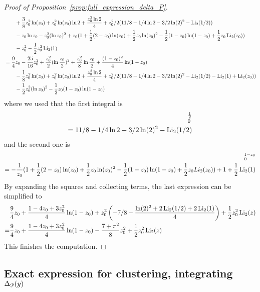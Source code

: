\begin{proof}[Proof of Proposition~\ref{prop:full_expression_delta_P}]
\begin{align*}
&\qquad+\frac{3}{8}z_0^2\ln(z_0)+z_0^2\ln(z_0)\ln 2+\frac{z_0^2 \ln2}{4}+z_0^2/2(11/8 -1/4 \ln 2 -3/2\ln(2)^2 -  \operatorname{Li}_2(1/2)) \\
&\qquad-z_0 \ln z_0-z_0^2(\ln z_0)^2+z_0(1 + \frac{1}{2}(2-z_0) \ln(z_0) + \frac{1}{2}z_0 \ln(z_0)^2 - \frac{1}{2} (1-z_0) \ln(1-z_0) +\frac{1}{2}z_0 \operatorname{Li}_2(z_0))\\
&\qquad-z_0^2   -\frac{1}{2}  z_0^2\operatorname{Li}_2(1) \\
&=\frac{9}{4}z_0-\frac{25}{16}z_0^2 +\frac{z_0^2}{2}(\ln\frac{z_0}{2})^2+\frac{z_0^2}{8}\ln\frac{z_0}{2} +\frac{(1-z_0)^2}{4}\ln(1-z_0) \\
&\qquad-\frac{1}{8}z_0^2\ln(z_0)+z_0^2\ln(z_0)\ln 2+\frac{z_0^2 \ln2}{4}+z_0^2/2(11/8 -1/4 \ln 2 -3/2\ln(2)^2 -  \operatorname{Li}_2(1/2)-\operatorname{Li}_2(1)+\operatorname{Li}_2(z_0)) \\
&\qquad-\frac{1}{2}z_0^2(\ln z_0)^2 - \frac{1}{2} z_0(1-z_0) \ln(1-z_0)
\end{align*}
where we used that the first integral is
\begin{align*}
[1/2 (-2 + 5 t + t^2 - \ln(1 - t)^2 - 2 t \ln t - t^2 \ln t - 
   \ln(1 - t) (-3 + 2 t + t^2 + 2\ln t) - 2 \Li_2(t))]_0^{\frac{1}{2}} \\
= 11/8 -1/4 \ln 2 -3/2\ln(2)^2 -  \Li_2(1/2)
\end{align*}
and the second one is
\begin{align*}
[\frac{1}{-1+ t} (1 + \frac{1}{2}(1 + t) \ln(1 - t) + \frac{1}{2}(1 - t) \ln(
1 -t)^2 - \frac{1}{2} t \ln(t) +\frac{1}{2} (1 - t) \Li_2(1 -t))]_0^{1-z_0} \\
=-\frac{1}{z_0} (1 + \frac{1}{2}(2-z_0) \ln(z_0) + \frac{1}{2}z_0 \ln(z_0)^2 - \frac{1}{2} (1-z_0) \ln(1-z_0) +\frac{1}{2}z_0 Li_2(z_0))+1   +\frac{1}{2}  \Li_2(1)
\end{align*}
By expanding the squares and collecting terms, the last expression can be simplified to
\begin{align*}
&\frac{9}{4} z_0 + \frac{1 - 4 z_0 + 3 z_0^2}{4}\ln(1 - z_0) + 
z_0^2 \left(-7/8 - \frac{\ln(2)^2+2\operatorname{Li}_2(1/2) + 2\operatorname{Li}_2(1)}{4} \right) + 
\frac{1}{2}z_0^2 \operatorname{Li}_2(z) \\
=&\frac{9}{4} z_0 + \frac{1 - 4 z_0 + 3 z_0^2}{4}\ln(1 - z_0) - \frac{7+\pi^2}{8}
z_0^2  + 
\frac{1}{2}z_0^2 \operatorname{Li}_2(z)
\end{align*}
This finishes the computation.

\end{proof}

\subsection{Exact expression for clustering, integrating $\Delta_{{\mathcal P}}(y)$}

